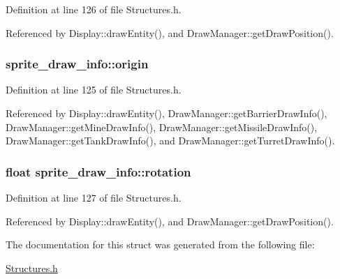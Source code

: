 Definition at line 126 of file Structures.\-h.



Referenced by Display\-::draw\-Entity(), and Draw\-Manager\-::get\-Draw\-Position().

\hypertarget{structsprite__draw__info_a7c12e335ba1fc83156a05a568d38a179}{
\subsubsection[{origin}]{ sprite\-\_\-draw\-\_\-info\-::origin}}\label{structsprite__draw__info_a7c12e335ba1fc83156a05a568d38a179}


Definition at line 125 of file Structures.\-h.



Referenced by Display\-::draw\-Entity(), Draw\-Manager\-::get\-Barrier\-Draw\-Info(), Draw\-Manager\-::get\-Mine\-Draw\-Info(), Draw\-Manager\-::get\-Missile\-Draw\-Info(), Draw\-Manager\-::get\-Tank\-Draw\-Info(), and Draw\-Manager\-::get\-Turret\-Draw\-Info().

\hypertarget{structsprite__draw__info_a41292dd9fa6ca00d553a6c93f18e2a40}{
\subsubsection[{rotation}]{\setlength{\rightskip}{0pt plus 5cm}float sprite\-\_\-draw\-\_\-info\-::rotation}}\label{structsprite__draw__info_a41292dd9fa6ca00d553a6c93f18e2a40}


Definition at line 127 of file Structures.\-h.



Referenced by Display\-::draw\-Entity(), and Draw\-Manager\-::get\-Draw\-Position().



The documentation for this struct was generated from the following file\-:\begin{DoxyCompactItemize}
\item 
\hyperlink{Structures_8h}{Structures.\-h}\end{DoxyCompactItemize}
